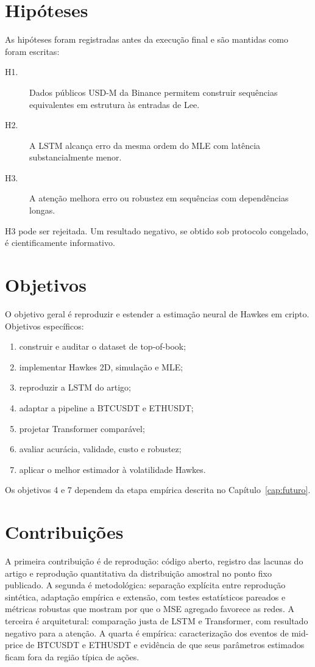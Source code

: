 \documentclass[12pt,a4paper,openany]{report}
\begin{document}
\section{Hipóteses}

As hipóteses foram registradas antes da execução final e são mantidas como foram
escritas:

\begin{description}
  \item[H1.] Dados públicos USD-M da Binance permitem construir sequências equivalentes
  em estrutura às entradas de Lee.
  \item[H2.] A LSTM alcança erro da mesma ordem do MLE com latência substancialmente menor.
  \item[H3.] A atenção melhora erro ou robustez em sequências com dependências longas.
\end{description}

H3 pode ser rejeitada. Um resultado negativo, se obtido sob protocolo congelado, é
cientificamente informativo.

\section{Objetivos}

O objetivo geral é reproduzir e estender a estimação neural de Hawkes em cripto.
Objetivos específicos:
\begin{enumerate}
  \item construir e auditar o dataset de top-of-book;
  \item implementar Hawkes 2D, simulação e MLE;
  \item reproduzir a LSTM do artigo;
  \item adaptar a pipeline a BTCUSDT e ETHUSDT;
  \item projetar Transformer comparável;
  \item avaliar acurácia, validade, custo e robustez;
  \item aplicar o melhor estimador à volatilidade Hawkes.
\end{enumerate}
Os objetivos 4 e 7 dependem da etapa empírica descrita no
Capítulo~\ref{cap:futuro}.

\section{Contribuições}

A primeira contribuição é de reprodução: código aberto, registro das lacunas do
artigo e reprodução quantitativa da distribuição amostral no ponto fixo publicado. A
segunda é metodológica: separação explícita entre reprodução sintética, adaptação
empírica e extensão, com testes estatísticos pareados e métricas robustas que mostram
por que o MSE agregado favorece as redes. A terceira é arquitetural: comparação justa
de LSTM e Transformer, com resultado negativo para a atenção. A quarta é empírica:
caracterização dos eventos de mid-price de BTCUSDT e ETHUSDT e evidência de que seus
parâmetros estimados ficam fora da região típica de ações.
\end{document}
